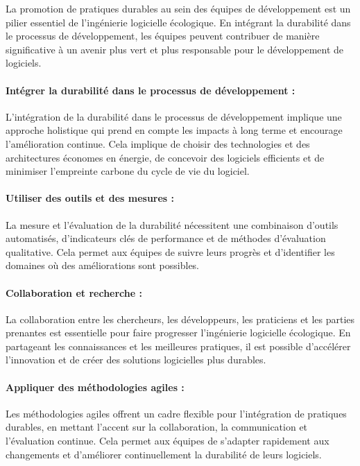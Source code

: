 La promotion de pratiques durables au sein des équipes de développement est un pilier essentiel de l'ingénierie logicielle écologique. En intégrant la durabilité dans le processus de développement, les équipes peuvent contribuer de manière significative à un avenir plus vert et plus responsable pour le développement de logiciels.

\paragraph{Intégrer la durabilité dans le processus de développement :} L'intégration de la durabilité dans le processus de développement implique une approche holistique qui prend en compte les impacts à long terme et encourage l'amélioration continue. Cela implique de choisir des technologies et des architectures économes en énergie, de concevoir des logiciels efficients et de minimiser l'empreinte carbone du cycle de vie du logiciel.

\paragraph{Utiliser des outils et des mesures :} La mesure et l'évaluation de la durabilité nécessitent une combinaison d'outils automatisés, d'indicateurs clés de performance et de méthodes d'évaluation qualitative. Cela permet aux équipes de suivre leurs progrès et d'identifier les domaines où des améliorations sont possibles.

\paragraph{Collaboration et recherche :} La collaboration entre les chercheurs, les développeurs, les praticiens et les parties prenantes est essentielle pour faire progresser l'ingénierie logicielle écologique. En partageant les connaissances et les meilleures pratiques, il est possible d'accélérer l'innovation et de créer des solutions logicielles plus durables.

\paragraph{Appliquer des méthodologies agiles :} Les méthodologies agiles offrent un cadre flexible pour l'intégration de pratiques durables, en mettant l'accent sur la collaboration, la communication et l'évaluation continue. Cela permet aux équipes de s'adapter rapidement aux changements et d'améliorer continuellement la durabilité de leurs logiciels.

